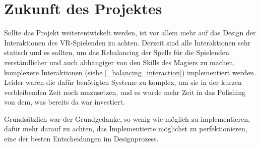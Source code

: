 \section{Zukunft des Projektes}

Sollte das Projekt weiterentwickelt werden, ist vor allem mehr auf das Design der Interaktionen des VR-Spielenden zu achten. Derzeit sind alle Interaktionen sehr statisch und es sollten, um das Rebalancing der Spells für die Spielenden verständlicher und auch abhängiger von den Skills des Magiers zu machen, komplexere Interaktionen (siehe \ref{_balancing_interaction}) implementiert werden. Leider waren die dafür benötigten Systeme zu komplex, um sie in der kurzen verbleibenden Zeit noch umzusetzen, und es wurde mehr Zeit in das Polishing von dem, was bereits da war investiert.

Grundsätzlich war der Grundgedanke, so wenig wie möglich zu implementieren, dafür mehr darauf zu achten, das Implementierte möglichst zu perfektionieren, eine der besten Entscheidungen im Designprozess.